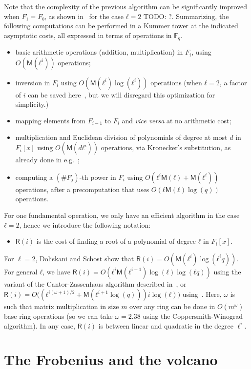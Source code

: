 \documentclass{lms}
\newcommand{\todo}[1]{{\color{red}TODO: #1}}
\def\cout#1{\mathsf{#1}}
\newcommand{\F}{\mathbb{F}}
\newcommand{\MM}{\cout{M}}
\newcommand{\RR}{\cout{R}}
\begin{document}
Note that the complexity of the previous algorithm can be
significantly improved when $F₁=F₀$, as shown in~\cite{DoSc12} for the
case $ℓ=2$ \todo{?}.  Summarizing, the following computations can be performed
in a Kummer tower at the indicated asymptotic costs, all expressed in 
terms of operations in $\F_q$.
\begin{itemize}
\item basic arithmetic operations (addition, multiplication) in $F_i$,
  using $O(\MM(ℓ^i))$ operations;
\item inversion in $F_i$ using $O(\MM(ℓ^i)\log(ℓ^i))$
  operations (when $ℓ=2$, a factor of $i$ can be saved
    here~\cite{DoSc12}, but we will disregard this optimization for
    simplicity.)
\item mapping elements from $F_{i-1}$ to $F_i$ and \emph{vice versa}
  at no arithmetic cost;
\item multiplication and Euclidean division of polynomials of degree
  at most $d$ in $F_i[x]$ using $O(\MM(dℓ^i))$ operations, via
  Kronecker's
  substitution, as already done in e.g.~\cite{vzgathen+shoup92};
\item computing a $(\#F_j)$-th power in $F_i$ using
  $O(ℓ^i\MM(ℓ) + \MM(ℓ^i))$ operations, after a precomputation that
  uses $O(ℓ\MM(ℓ)\log(q))$ operations.
\end{itemize}

For one fundamental operation, we only have an efficient algorithm in
the case $ℓ=2$, hence we introduce the following notation:
\begin{itemize}
\item $\RR(i)$ is the cost of finding a root of a polynomial of degree
  $ℓ$ in $F_i[x]$.
\end{itemize}
For $\ell=2$, Doliskani and Schost show that
$\RR(i)=O(\MM(ℓ^i)\log(ℓ^iq))$. For general $ℓ$, we have
$\RR(i)=O(ℓ^i\MM(ℓ^{i+1})\log(ℓ)\log(ℓq))$ using the variant of the
Cantor-Zassenhaus algorithm described in~\cite[Chapter~14.5]{vzGG}, or
$\RR(i)=O\bigl((ℓ^{i(ω+1)/2}+\MM(ℓ^{i+1}\log (q)))i\log(ℓ)\bigr)$
using~\cite{kaltofen+shoup97}. Here, $\omega$ is such that matrix
multiplication in size $m$ over any ring can be done in $O(m^\omega)$
base ring operations (so we can take $\omega =2.38$ using the 
Coppersmith-Winograd algorithm). In any case, $\RR(i)$ is between 
linear and quadratic in the degree $\ell^{i}$.

\section{The Frobenius and the volcano}
\label{sec:isogeny-volcanoes}
\end{document}
